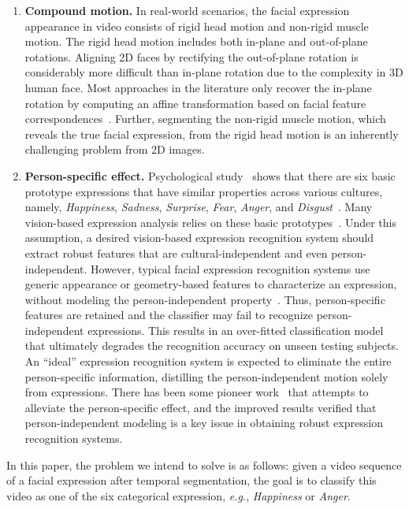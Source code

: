 \documentclass[journal]{IEEEtran}
\begin{document}
\begin{enumerate}

\item \textbf{Compound motion.} In real-world scenarios, the facial expression appearance in video consists of rigid head motion and non-rigid muscle motion. The rigid head motion includes both in-plane and out-of-plane rotations. Aligning 2D faces by rectifying the out-of-plane rotation is considerably more difficult than in-plane rotation due to the complexity in 3D human face. Most approaches in the literature only recover the in-plane rotation by computing an affine transformation based on facial feature correspondences~\cite{Bartlett_FG11,Valstar_FERA11}. Further, segmenting the non-rigid muscle motion, which reveals the true facial expression, from the rigid head motion is an inherently challenging problem from 2D images.

\item \textbf{Person-specific effect.} Psychological study~\cite{Fridlund_87} shows that there are six basic prototype expressions that have similar properties across various cultures, namely, \textit{Happiness}, \textit{Sadness}, \textit{Surprise}, \textit{Fear}, \textit{Anger}, and \textit{Disgust}~\cite{Fridlund_87}.  Many vision-based expression analysis relies on these basic prototypes~\cite{Pantic_PAMI00}. Under this assumption, a desired vision-based expression recognition system should extract robust features that are cultural-independent and even person-independent. However, typical facial expression recognition systems use generic appearance or geometry-based features to characterize an expression, without modeling the person-independent property~\cite{Bartlett_FG11,Valstar_SMCB12}. Thus, person-specific features are retained and the classifier may fail to recognize person-independent expressions. This results in an over-fitted classification model that ultimately degrades the recognition accuracy on unseen testing subjects. An ``ideal'' expression recognition system is expected to eliminate the entire person-specific information, distilling the person-independent motion solely from expressions. There has been some pioneer work~\cite{Yang_SMCB12,Dahmane_TMM14} that attempts to alleviate the person-specific effect, and the improved results verified that person-independent modeling is a key issue in obtaining robust expression recognition systems.

\end{enumerate}

In this paper, the problem we intend to solve is as follows: given a video sequence of a facial expression after temporal segmentation, the goal is to classify this video as one of the six categorical expression, \textit{e.g.}, \textit{Happiness} or \textit{Anger}. 
\end{document}
